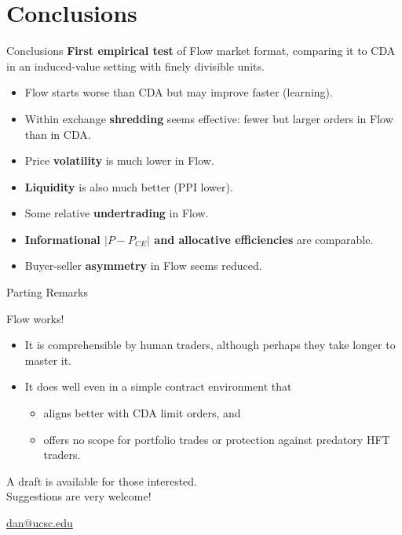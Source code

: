 \documentclass[10pt]{beamer}
\begin{document}
\section{Conclusions}

\begin{frame}{Conclusions}
\textbf{First empirical test} of Flow market format, comparing it to CDA in an induced-value setting with finely divisible units. \pause
\begin{itemize}
\item Flow starts worse than CDA but may improve faster (learning).
\item Within exchange \textbf{shredding} seems effective: fewer but larger orders in Flow than in CDA.
\item Price \textbf{volatility} is much lower in Flow. 
\item \textbf{Liquidity} is also much better (PPI lower). \pause
\item Some relative \textbf{undertrading} in Flow.
\item \textbf{Informational  $|P-P_{CE}|$ and allocative efficiencies} are comparable. \pause
\item Buyer-seller \textbf{asymmetry} in Flow seems reduced.\pause
\end{itemize} 
\end{frame}


\begin{frame}{Parting Remarks}

Flow works!
\begin{itemize}
    \item It is comprehensible by human traders, although perhaps they take longer to master it.
    \item It does well even in a simple contract environment that
\begin{itemize}
    \item aligns better with CDA limit orders, and
    \item offers no scope for portfolio trades or protection against predatory HFT traders.
\end{itemize}
\end{itemize}


\vspace{.4in}

\begin{center}
{\large A draft is available for those interested. \\ Suggestions are very welcome!}

\url{dan@ucsc.edu}
    
\end{center}


\end{frame}
\end{document}
